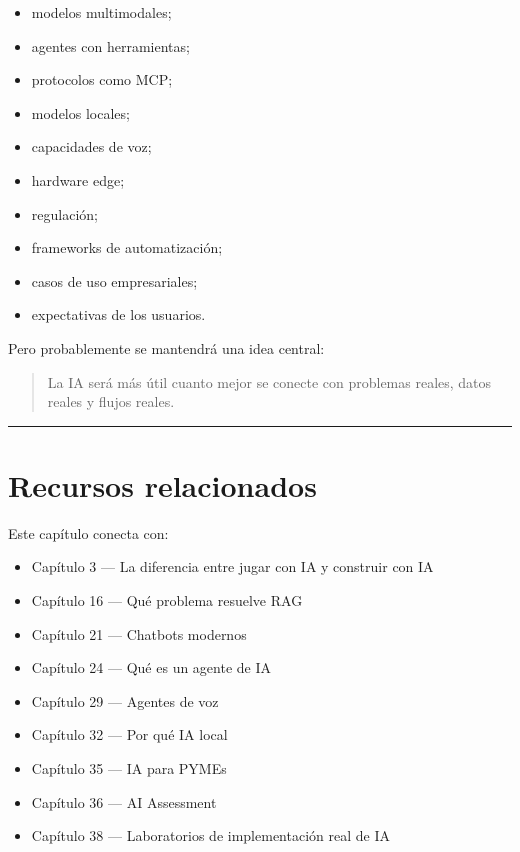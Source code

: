 \begin{itemize}
\tightlist
\item
  modelos multimodales;
\item
  agentes con herramientas;
\item
  protocolos como MCP;
\item
  modelos locales;
\item
  capacidades de voz;
\item
  hardware edge;
\item
  regulación;
\item
  frameworks de automatización;
\item
  casos de uso empresariales;
\item
  expectativas de los usuarios.
\end{itemize}

Pero probablemente se mantendrá una idea central:

\begin{quote}
La IA será más útil cuanto mejor se conecte con problemas reales, datos
reales y flujos reales.
\end{quote}

\begin{center}\rule{0.5\linewidth}{0.5pt}\end{center}

\section{Recursos relacionados}\label{recursos-relacionados-1}

Este capítulo conecta con:

\begin{itemize}
\tightlist
\item
  Capítulo 3 --- La diferencia entre jugar con IA y construir con IA
\item
  Capítulo 16 --- Qué problema resuelve RAG
\item
  Capítulo 21 --- Chatbots modernos
\item
  Capítulo 24 --- Qué es un agente de IA
\item
  Capítulo 29 --- Agentes de voz
\item
  Capítulo 32 --- Por qué IA local
\item
  Capítulo 35 --- IA para PYMEs
\item
  Capítulo 36 --- AI Assessment
\item
  Capítulo 38 --- Laboratorios de implementación real de IA
\end{itemize}

